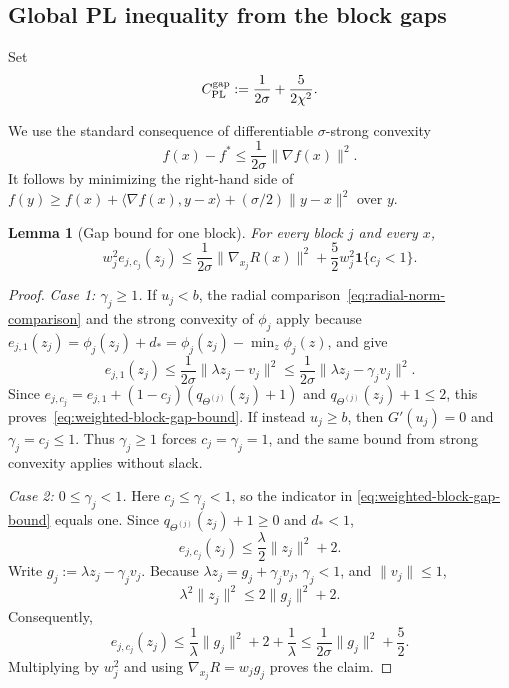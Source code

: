 \documentclass{article}
\newtheorem{lemma}[theorem]{Lemma}
\theoremstyle{definition}
\begin{document}
\subsection{Global PL inequality from the block gaps}

Set
\begin{equation}
 C_{\rm PL}^{\rm gap}
 :=\frac1{2\sigma}+\frac{5}{2\chi^2}.
 \label{eq:block-gap-pl-constant}
\end{equation}

We use the standard consequence of differentiable $\sigma$-strong convexity
\begin{equation}
 f(x)-f^*\le\frac1{2\sigma}\|\nabla f(x)\|^2.
 \label{eq:strong-convex-gradient-domination}
\end{equation}
It follows by minimizing the right-hand side of
$f(y)\ge f(x)+\langle\nabla f(x),y-x\rangle
+(\sigma/2)\|y-x\|^2$ over $y$.

\begin{lemma}[Gap bound for one block]
\label{lem:weighted-block-gap}
For every block $j$ and every $x$,
\begin{equation}
 w_j^2e_{j,c_j}(z_j)
 \le\frac1{2\sigma}\|\nabla_{x_j}R(x)\|^2
 +\frac52w_j^2\mathbf 1\{c_j<1\}.
 \label{eq:weighted-block-gap-bound}
\end{equation}
\end{lemma}

\begin{proof}
\emph{Case 1: $\gamma_j\ge1$.}
If $u_j<b$, the radial
comparison~\eqref{eq:radial-norm-comparison} and the strong convexity of
$\phi_j$ apply because
$e_{j,1}(z_j)=\phi_j(z_j)+d_*=\phi_j(z_j)-\min_z\phi_j(z)$, and give
\begin{equation}
 e_{j,1}(z_j)
 \le\frac1{2\sigma}\|\lambda z_j-v_j\|^2
 \le\frac1{2\sigma}\|\lambda z_j-\gamma_jv_j\|^2.
\end{equation}
Since
$e_{j,c_j}=e_{j,1}+(1-c_j)(q_{\Theta^{(j)}}(z_j)+1)$ and
$q_{\Theta^{(j)}}(z_j)+1\le2$, this proves~\eqref{eq:weighted-block-gap-bound}.
If instead $u_j\ge b$, then $G'(u_j)=0$ and
$\gamma_j=c_j\le1$.  Thus $\gamma_j\ge1$ forces
$c_j=\gamma_j=1$, and the same bound from strong convexity applies without slack.

\emph{Case 2: $0\le\gamma_j<1$.}
Here $c_j\le\gamma_j<1$, so the indicator in
\eqref{eq:weighted-block-gap-bound} equals one.  Since
$q_{\Theta^{(j)}}(z_j)+1\ge0$ and $d_*<1$,
\begin{equation}
 e_{j,c_j}(z_j)\le\frac\lambda2\|z_j\|^2+2.
\end{equation}
Write $g_j:=\lambda z_j-\gamma_jv_j$.  Because
$\lambda z_j=g_j+\gamma_jv_j$, $\gamma_j<1$, and $\|v_j\|\le1$,
\begin{equation}
 \lambda^2\|z_j\|^2\le2\|g_j\|^2+2.
\end{equation}
Consequently,
\begin{equation}
 e_{j,c_j}(z_j)
 \le\frac1\lambda\|g_j\|^2+2+\frac1\lambda
 \le\frac1{2\sigma}\|g_j\|^2+\frac52.
\end{equation}
Multiplying by $w_j^2$ and using
$\nabla_{x_j}R=w_jg_j$ proves the claim.
\end{proof}
\end{document}
